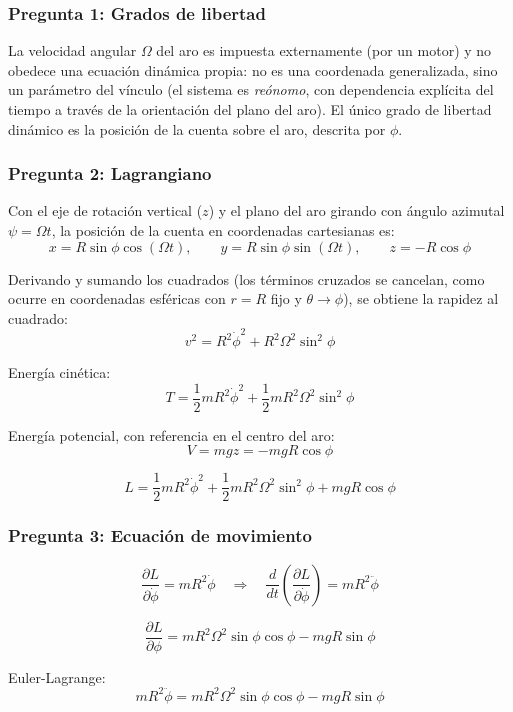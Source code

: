 \begin{sol}

\subsubsection*{Pregunta 1: Grados de libertad}

La velocidad angular $\Omega$ del aro es impuesta externamente (por un motor) y no obedece una ecuación dinámica propia: no es una coordenada generalizada, sino un parámetro del vínculo (el sistema es \emph{reónomo}, con dependencia explícita del tiempo a través de la orientación del plano del aro). El único grado de libertad dinámico es la posición de la cuenta sobre el aro, descrita por $\phi$.

\subsubsection*{Pregunta 2: Lagrangiano}

Con el eje de rotación vertical ($z$) y el plano del aro girando con ángulo azimutal $\psi = \Omega t$, la posición de la cuenta en coordenadas cartesianas es:
$$x = R\sin\phi\cos(\Omega t), \qquad y = R\sin\phi\sin(\Omega t), \qquad z = -R\cos\phi$$

Derivando y sumando los cuadrados (los términos cruzados se cancelan, como ocurre en coordenadas esféricas con $r=R$ fijo y $\theta \to \phi$), se obtiene la rapidez al cuadrado:
$$v^2 = R^2\dot\phi^2 + R^2\Omega^2\sin^2\phi$$

Energía cinética:
$$T = \frac{1}{2}mR^2\dot\phi^2 + \frac{1}{2}mR^2\Omega^2\sin^2\phi$$

Energía potencial, con referencia en el centro del aro:
$$V = mgz = -mgR\cos\phi$$

$$\boxed{L = \frac{1}{2}mR^2\dot\phi^2 + \frac{1}{2}mR^2\Omega^2\sin^2\phi + mgR\cos\phi}$$

\subsubsection*{Pregunta 3: Ecuación de movimiento}

$$\frac{\partial L}{\partial\dot\phi} = mR^2\dot\phi \quad\Rightarrow\quad \frac{d}{dt}\left(\frac{\partial L}{\partial\dot\phi}\right) = mR^2\ddot\phi$$

$$\frac{\partial L}{\partial\phi} = mR^2\Omega^2\sin\phi\cos\phi - mgR\sin\phi$$

Euler-Lagrange:
$$mR^2\ddot\phi = mR^2\Omega^2\sin\phi\cos\phi - mgR\sin\phi$$


\end{sol}
